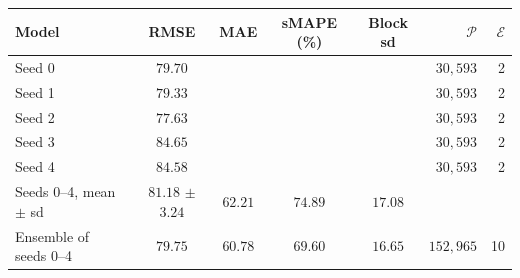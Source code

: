 \begin{tabular}{l c c c c r r}
\toprule
\textbf{Model} & RMSE & MAE & sMAPE (\%) & Block sd & $\mathcal{P}$ & $\mathcal{E}$ \\
\midrule
Seed 0 & $79.70$ & & & & $30{,}593$ & 2 \\
Seed 1 & $79.33$ & & & & $30{,}593$ & 2 \\
Seed 2 & $77.63$ & & & & $30{,}593$ & 2 \\
Seed 3 & $84.65$ & & & & $30{,}593$ & 2 \\
Seed 4 & $84.58$ & & & & $30{,}593$ & 2 \\
Seeds 0--4, mean $\pm$ sd & $81.18$ $\pm$ $3.24$ & $62.21$ & $74.89$ & $17.08$ & & \\
\midrule
Ensemble of seeds 0--4 & $79.75$ & $60.78$ & $69.60$ & $16.65$ & $152{,}965$ & 10 \\
\bottomrule
\end{tabular}
